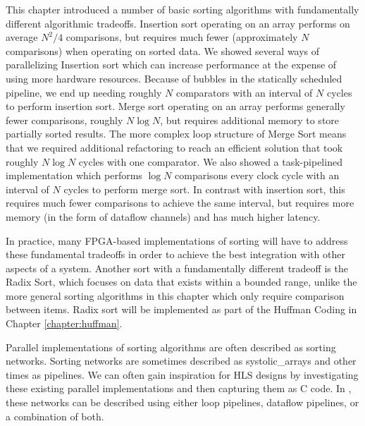 This chapter introduced a number of basic sorting algorithms with fundamentally different algorithmic tradeoffs.  Insertion sort operating on an array performs on average $N^2/4$ comparisons, but requires much fewer (approximately $N$ comparisons) when operating on sorted data. We showed several ways of parallelizing Insertion sort which can increase performance at the expense of using more hardware resources.  Because of bubbles in the statically scheduled pipeline, we end up needing roughly $N$ comparators with an interval of $N$ cycles to perform insertion sort.  Merge sort operating on an array performs generally fewer comparisons, roughly $N \log N$, but requires additional memory to store partially sorted results.  The more complex loop structure of Merge Sort means that we required additional refactoring to reach an efficient solution that took roughly $N \log N$ cycles with one comparator.  We also showed a task-pipelined implementation which performs $\log N$ comparisons every clock cycle with an interval of $N$ cycles to perform merge sort.  In contrast with insertion sort, this requires much fewer comparisons to achieve the same interval, but requires more memory (in the form of dataflow channels) and has much higher latency.

In practice, many FPGA-based implementations of sorting will have to address these fundamental tradeoffs in order to achieve the best integration with other aspects of a system. Another sort with a fundamentally different tradeoff is the Radix Sort, which focuses on data that exists within a bounded range, unlike the more general sorting algorithms in this chapter which only require comparison between items.  Radix sort will be implemented as part of the Huffman Coding in Chapter \ref{chapter:huffman}.

Parallel implementations of sorting algorithms are often described as sorting networks.  Sorting networks are sometimes described as \glspl{systolic_array} and other times as pipelines.  We can often gain inspiration for HLS designs by investigating these existing parallel implementations and then capturing them as C code.  In \VHLS, these networks can be described using either loop pipelines, dataflow pipelines, or a combination of both.
 
